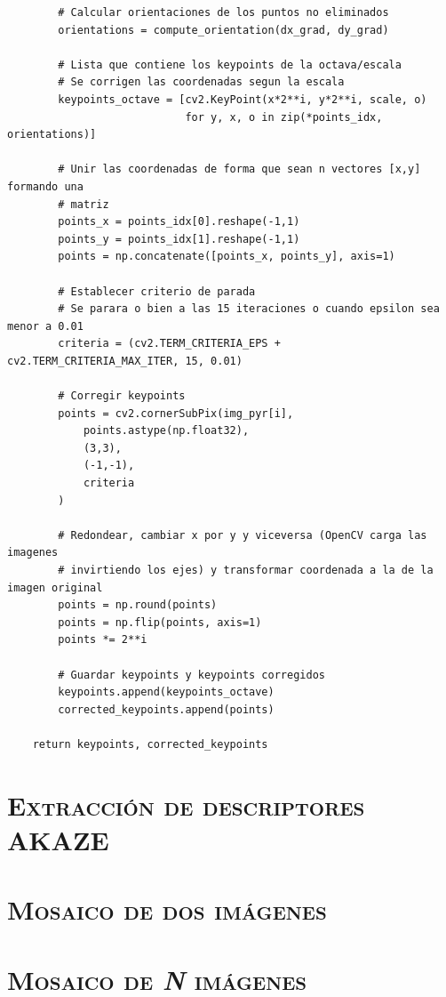 \documentclass[11pt,a4paper]{article}
\begin{document}
\begin{lstlisting}
        # Calcular orientaciones de los puntos no eliminados
        orientations = compute_orientation(dx_grad, dy_grad)

        # Lista que contiene los keypoints de la octava/escala
        # Se corrigen las coordenadas segun la escala
        keypoints_octave = [cv2.KeyPoint(x*2**i, y*2**i, scale, o)
                            for y, x, o in zip(*points_idx, orientations)]

        # Unir las coordenadas de forma que sean n vectores [x,y] formando una  
        # matriz
        points_x = points_idx[0].reshape(-1,1)
        points_y = points_idx[1].reshape(-1,1)
        points = np.concatenate([points_x, points_y], axis=1)

        # Establecer criterio de parada
        # Se parara o bien a las 15 iteraciones o cuando epsilon sea menor a 0.01
        criteria = (cv2.TERM_CRITERIA_EPS + cv2.TERM_CRITERIA_MAX_ITER, 15, 0.01)

        # Corregir keypoints
        points = cv2.cornerSubPix(img_pyr[i],
            points.astype(np.float32),
            (3,3),
            (-1,-1),
            criteria
        )

        # Redondear, cambiar x por y y viceversa (OpenCV carga las imagenes
        # invirtiendo los ejes) y transformar coordenada a la de la imagen original
        points = np.round(points)
        points = np.flip(points, axis=1)
        points *= 2**i

        # Guardar keypoints y keypoints corregidos
        keypoints.append(keypoints_octave)
        corrected_keypoints.append(points)

    return keypoints, corrected_keypoints
\end{lstlisting}



\section{\textsc{Extracción de descriptores AKAZE}}

\section{\textsc{Mosaico de dos imágenes}}

\section{\textsc{Mosaico de \textit{N} imágenes}}

\newpage



\end{document}

